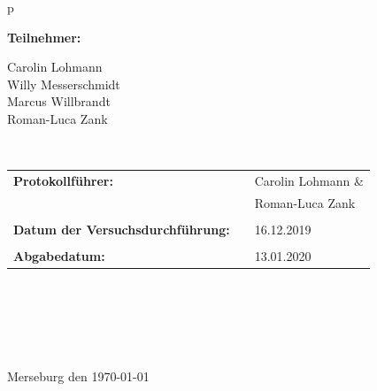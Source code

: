\begin{center}
\begin{tabular}{p{\textwidth}}
\begin{center}
\Large{\textbf{Teilnehmer:}} \\ 
\end{center}
\begin{center}
\large{Carolin Lohmann \\
	Willy Messerschmidt \\
	Marcus Willbrandt \\
	Roman-Luca Zank} \\
\end{center}


\\

\begin{center}
\begin{tabular}{lll}
\large{\textbf{Protokollführer:}} & & \large{Carolin Lohmann \&} \\
&& \large{Roman-Luca Zank}\\
&&\\
\large{\textbf{Datum der Versuchsdurchführung:}}&& \large{16.12.2019}\\
&&\\
\large{\textbf{Abgabedatum:}}&& \large{13.01.2020}
\end{tabular}
\end{center}

\\ \\ \\ \\ \\ 
\large{Merseburg den \today}

\end{tabular}
\end{center}
